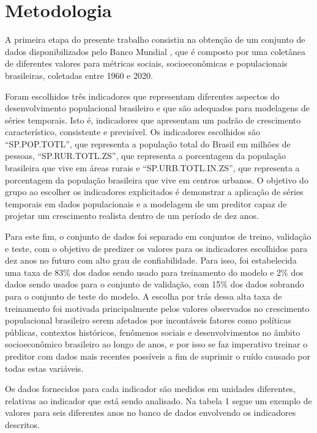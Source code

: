 \section{Metodologia}

A primeira etapa do presente trabalho consistiu na obtenção de um conjunto 
de dados disponibilizados pelo Banco Mundial \cite{Dataset:6}, que é composto por uma 
coletânea de diferentes valores para métricas sociais, socioeconômicas e 
populacionais brasileiras, coletadas entre 1960 e 2020.

Foram escolhidos três indicadores que representam diferentes aspectos do 
desenvolvimento populacional brasileiro e que são adequados para modelagens 
de séries temporais. Isto é, indicadores que apresentam um padrão de crescimento 
característico, consistente e previsível. Os indicadores escolhidos são 
``SP.POP.TOTL'', que representa a população total do Brasil em milhões de 
pessoas, ``SP.RUR.TOTL.ZS'', que representa a porcentagem da população brasileira 
que vive em áreas rurais e ``SP.URB.TOTL.IN.ZS'', que representa a porcentagem 
da população brasileira que vive em centros urbanos. O objetivo do grupo ao 
escolher os indicadores explicitados é demonstrar a aplicação de séries temporais 
em dados populacionais e a modelagem de um preditor capaz de projetar um 
crescimento realista dentro de um período de dez anos.

Para este fim, o conjunto de dados foi separado em conjuntos de treino, 
validação e teste, com o objetivo de predizer os valores para os indicadores 
escolhidos para dez anos no futuro com alto grau de confiabilidade. Para isso,
 foi estabelecida uma taxa de 83\% dos dados sendo usado para treinamento do modelo 
 e 2\% dos dados sendo usados para o conjunto de validação, com 15\% dos dados 
 sobrando para o conjunto de teste do modelo. A escolha por trás dessa alta 
 taxa de treinamento foi motivada principalmente pelos valores observados no 
 crescimento populacional brasileiro serem afetados por incontáveis fatores 
 como políticas públicas, contextos históricos, fenômenos sociais e 
 desenvolvimentos no âmbito socioeconômico brasileiro ao longo de anos, e 
 por isso se faz imperativo treinar o preditor com dados mais recentes possíveis 
 a fim de suprimir o ruído causado por todas estas variáveis. 


Os dados fornecidos para cada indicador são medidos em unidades diferentes, 
relativas ao indicador que está sendo analisado. Na tabela 1 segue um exemplo 
de valores para seis diferentes anos no banco de dados envolvendo os indicadores descritos.


